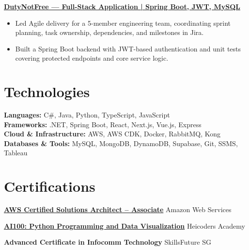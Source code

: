 \documentclass[10pt, letterpaper]{article}
\newenvironment{resumeitemize}{
    \begin{itemize}[
        leftmargin=1.15em,
        itemsep=0.12em,
        topsep=0.12em,
        parsep=0.04em,
        partopsep=0pt
    ]
}{
    \end{itemize}
}
\begin{document}
\textbf{\href{https://github.com/NickySeah/DutyNotFree}{DutyNotFree — Full-Stack Application | Spring Boot, JWT, MySQL}}

\begin{resumeitemize}
    \item Led Agile delivery for a 5-member engineering team, coordinating sprint planning, task ownership, dependencies, and milestones in Jira.
    \item Built a Spring Boot backend with JWT-based authentication and unit tests covering protected endpoints and core service logic.
\end{resumeitemize}

\section{Technologies}

\textbf{Languages:} C\#, Java, Python, TypeScript, JavaScript \\ 

\textbf{Frameworks:} .NET, Spring Boot, React, Next.js, Vue.js, Express \\

\textbf{Cloud \& Infrastructure:} AWS, AWS CDK, Docker, RabbitMQ, Kong \\

\textbf{Databases \& Tools:} MySQL, MongoDB, DynamoDB, Supabase, Git, SSMS, Tableau \\

\section{Certifications}

\textbf{\href{https://www.credly.com/badges/95267b1a-fc80-4af4-b35b-1c865d6dc534/linked_in_profile}{AWS Certified Solutions Architect -- Associate}} \hfill Amazon Web Services

\textbf{\href{https://cert.heicodersacademy.com/30ULUT1BHW}{AI100: Python Programming and Data Visualization}} \hfill Heicoders Academy

\textbf{Advanced Certificate in Infocomm Technology} \hfill SkillsFuture SG
\end{document}
